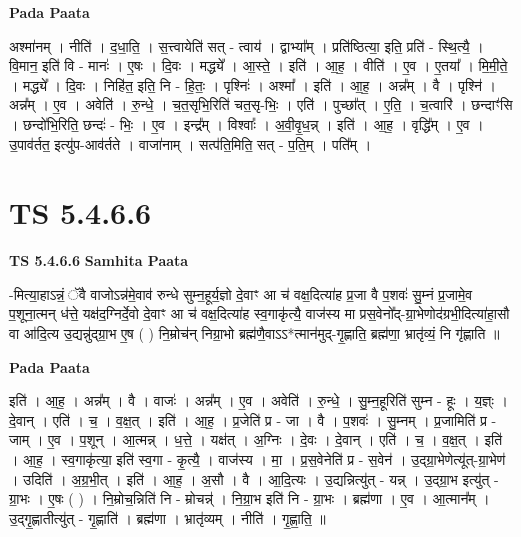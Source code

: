 \documentclass[17pt]{extarticle}
\begin{document}
\textbf{Pada Paata} \newline

अश्मा॑नम् । नीति॑ । द॒धा॒ति॒ । स॒त्त्वायेति॑ सत् - त्वाय॑ । द्वाभ्या᳚म् । प्रति॑ष्ठित्या॒ इति॒ प्रति॑ - स्थि॒त्यै॒ । वि॒मान॒ इति॑ वि - मानः॑ । ए॒षः । दि॒वः । मद्ध्ये᳚ । आ॒स्ते॒ । इति॑ । आ॒ह॒ । वीति॑ । ए॒व । ए॒तया᳚ । मि॒मी॒ते॒ । मद्ध्ये᳚ । दि॒वः । निहि॑त॒ इति॒ नि - हि॒तः॒ । पृश्निः॑ । अश्मा᳚ । इति॑ । आ॒ह॒ । अन्न᳚म् । वै । पृश्नि॑ । अन्न᳚म् । ए॒व । अवेति॑ । रु॒न्धे॒ । च॒त॒सृभि॒रिति॑ चत॒सृ-भिः॒ । एति॑ । पुच्छा᳚त् । ए॒ति॒ । च॒त्वारि॑ । छन्दाꣳ॑सि । छन्दो॑भि॒रिति॒ छन्दः॑ - भिः॒ । ए॒व । इन्द्र᳚म् । विश्वाः᳚ । अ॒वी॒वृ॒ध॒न्न् । इति॑ । आ॒ह॒ । वृद्धि᳚म् । ए॒व । उ॒पाव॑र्तत॒ इत्यु॑प-आव॑र्तते । वाजा॑नाम् । सत्प॑ति॒मिति॒ सत् - प॒ति॒म् । पति᳚म् ।  \newline





\section{ TS 5.4.6.6 }

\textbf{TS 5.4.6.6 } \newline
\textbf{Samhita Paata} \newline

-मित्या॒हाऽन्नं॒ ॅवै वाजोऽन्न॑मे॒वाव॑ रुन्धे सुम्न॒हूर्य॒ज्ञो दे॒वाꣳ आ च॑ वक्ष॒दित्या॑ह प्र॒जा वै प॒शवः॑ सु॒म्नं प्र॒जामे॒व प॒शूना॒त्मन् ध॑त्ते॒ यक्ष॑द॒ग्निर्दे॒वो दे॒वाꣳ आ च॑ वक्ष॒दित्या॑ह स्व॒गाकृ॑त्यै॒ वाज॑स्य मा प्रस॒वेनो᳚द्-ग्रा॒भेणोद॑ग्रभी॒दित्या॑हा॒सौ वा आ॑दि॒त्य उ॒द्यन्नु॑द्ग्रा॒भ ए॒ष ( ) नि॒म्रोच॑न् निग्रा॒भो ब्रह्म॑णै॒वाऽऽ*त्मान॑मुद्-गृ॒ह्णाति॒ ब्रह्म॑णा॒ भ्रातृ॑व्यं॒ नि गृ॑ह्णाति ॥ \newline

\textbf{Pada Paata} \newline

इति॑ । आ॒ह॒ । अन्न᳚म् । वै । वाजः॑ । अन्न᳚म् । ए॒व । अवेति॑ । रु॒न्धे॒ । सु॒म्न॒हूरिति॑ सुम्न - हूः । य॒ज्ञ्ः । दे॒वान् । एति॑ । च॒ । व॒क्ष॒त् । इति॑ । आ॒ह॒ । प्र॒जेति॑ प्र - जा । वै । प॒शवः॑ । सु॒म्नम् । प्र॒जामिति॑ प्र - जाम् । ए॒व । प॒शून् । आ॒त्मन्न् । ध॒त्ते॒ । यक्ष॑त् । अ॒ग्निः । दे॒वः । दे॒वान् । एति॑ । च॒ । व॒क्ष॒त् । इति॑ । आ॒ह॒ । स्व॒गाकृ॑त्या॒ इति॑ स्व॒गा - कृ॒त्यै॒ । वाज॑स्य । मा॒ । प्र॒स॒वेनेति॑ प्र - स॒वेन॑ । उ॒द्ग्रा॒भेणेत्यू॑त्-ग्रा॒भेण॑ । उदिति॑ । अ॒ग्र॒भी॒त् । इति॑ । आ॒ह॒ । अ॒सौ । वै । आ॒दि॒त्यः । उ॒द्यन्नित्यु॑त् - यन्न् । उ॒द्ग्रा॒भ इत्यु॑त् - ग्रा॒भः । ए॒षः ( ) । नि॒म्रोच॒न्निति॑ नि - म्रोचन्न्॑ । नि॒ग्रा॒भ इति॑ नि - ग्रा॒भः । ब्रह्म॑णा । ए॒व । आ॒त्मान᳚म् । उ॒द्गृ॒ह्णातीत्यु॑त् - गृ॒ह्णाति॑ । ब्रह्म॑णा । भ्रातृ॑व्यम् । नीति॑ । गृ॒ह्णा॒ति॒ ॥  \newline
\end{document}
